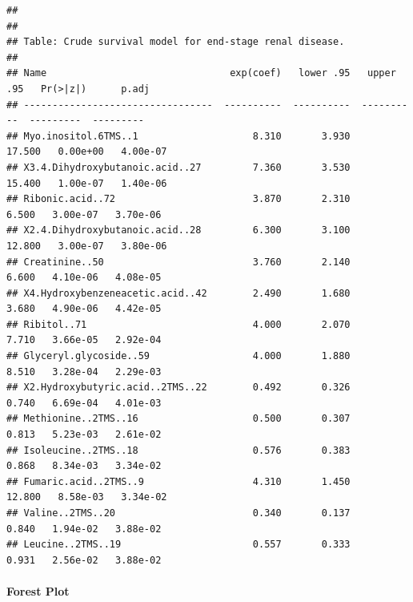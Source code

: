 \documentclass[]{article}
\let\oldparagraph\paragraph
\renewcommand{\paragraph}[1]{\oldparagraph{#1}\mbox{}}
\begin{document}
\begin{verbatim}
## 
## 
## Table: Crude survival model for end-stage renal disease.
## 
## Name                                exp(coef)   lower .95   upper .95   Pr(>|z|)      p.adj
## ---------------------------------  ----------  ----------  ----------  ---------  ---------
## Myo.inositol.6TMS..1                    8.310       3.930      17.500   0.00e+00   4.00e-07
## X3.4.Dihydroxybutanoic.acid..27         7.360       3.530      15.400   1.00e-07   1.40e-06
## Ribonic.acid..72                        3.870       2.310       6.500   3.00e-07   3.70e-06
## X2.4.Dihydroxybutanoic.acid..28         6.300       3.100      12.800   3.00e-07   3.80e-06
## Creatinine..50                          3.760       2.140       6.600   4.10e-06   4.08e-05
## X4.Hydroxybenzeneacetic.acid..42        2.490       1.680       3.680   4.90e-06   4.42e-05
## Ribitol..71                             4.000       2.070       7.710   3.66e-05   2.92e-04
## Glyceryl.glycoside..59                  4.000       1.880       8.510   3.28e-04   2.29e-03
## X2.Hydroxybutyric.acid..2TMS..22        0.492       0.326       0.740   6.69e-04   4.01e-03
## Methionine..2TMS..16                    0.500       0.307       0.813   5.23e-03   2.61e-02
## Isoleucine..2TMS..18                    0.576       0.383       0.868   8.34e-03   3.34e-02
## Fumaric.acid..2TMS..9                   4.310       1.450      12.800   8.58e-03   3.34e-02
## Valine..2TMS..20                        0.340       0.137       0.840   1.94e-02   3.88e-02
## Leucine..2TMS..19                       0.557       0.333       0.931   2.56e-02   3.88e-02
\end{verbatim}

\newpage

\hypertarget{forest-plot-6}{%
\paragraph{Forest Plot}\label{forest-plot-6}}
\end{document}
